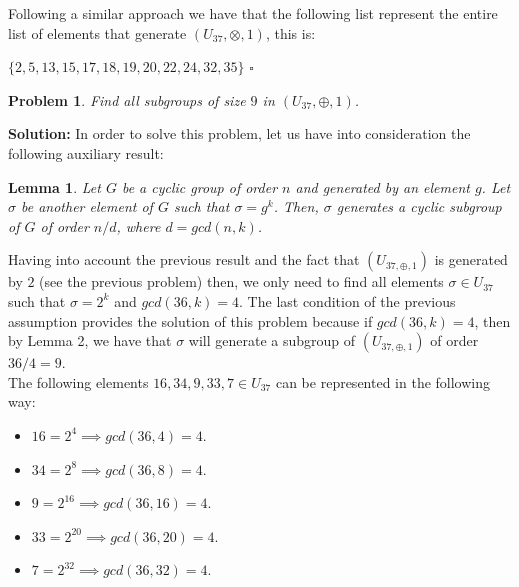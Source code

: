 \documentclass[a4paper,openany,11pt]{book}
\newtheorem{Lemma}{Lemma}
\newtheorem{Prob}{Problem}
\begin{document}
Following a similar approach we have that the following list represent the entire list of elements that generate $(U_{37},\otimes, 1)$, this is:

\begin{center}
	$\lbrace 2, 5, 13, 15, 17, 18, 19, 20, 22, 24 , 32, 35 \rbrace$\hspace{0.1cm} $\square$
\end{center}

\begin{Prob}
	Find all subgroups of size $9$ in $(U_{37},\oplus,1)$.
\end{Prob}

\textbf{Solution:} In order to solve this problem, let us have into consideration the following auxiliary result:

\begin{Lemma}
	Let $G$ be a cyclic group of order $n$ and generated by an element $g$. Let $\sigma$ be another element of $G$ such that $\sigma = g^{k}$. Then, $\sigma$ generates a cyclic subgroup of $G$ of order $n/d$, where $d = gcd(n,k)$.
\end{Lemma}

Having into account the previous result and the fact that $(U_{37,\oplus,1})$ is generated by $2$ (see the previous problem) then, we only need to find all elements $\sigma \in U_{37}$ such that $\sigma = 2^{k}$ and $gcd(36,k) = 4$. The last condition of the previous assumption provides the solution of this problem because if $gcd(36,k) = 4$, then by Lemma 2, we have that $\sigma$ will generate a subgroup of $(U_{37,\oplus,1})$ of order $36/4 = 9$.\\

The following elements $16, 34, 9, 33, 7 \in U_{37}$ can be represented in the following way:

\begin{itemize}
	\item $16 = 2^{4} \implies gcd(36,4) = 4$.
	
	\item $34 = 2^{8} \implies gcd(36,8) = 4$.
	
	\item $9 = 2^{16} \implies gcd(36,16) = 4$.
	
	\item $33 = 2^{20} \implies gcd(36,20) = 4$.
	
	\item $7 = 2^{32} \implies gcd(36,32) = 4$.
\end{itemize}
\end{document}
